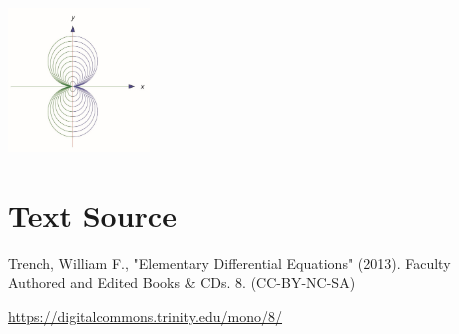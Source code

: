 \documentclass{ximera}
\begin{document}
\begin{example}
\begin{explanation}
\begin{image}
  \includegraphics[height=1.5in]{fig040513b.jpg} 
\end{image}

\end{explanation}
\end{example}


\section*{Text Source}
Trench, William F., "Elementary Differential Equations" (2013). Faculty Authored and Edited Books \& CDs. 8. (CC-BY-NC-SA)

\href{https://digitalcommons.trinity.edu/mono/8/}{https://digitalcommons.trinity.edu/mono/8/}
\end{document}

